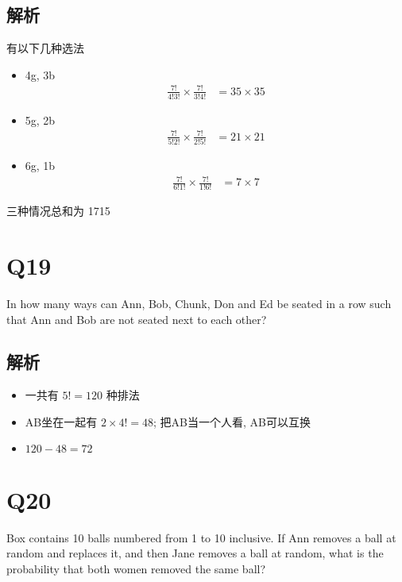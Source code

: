   \subsection{解析}

    有以下几种选法

    \begin{itemize}
      \item 4g, 3b
      \begin{align*}
        \frac{7!}{4!3!} \times \frac{7!}{3!4!} &= 35 \times 35
      \end{align*}

      \item 5g, 2b
      \begin{align*}
        \frac{7!}{5!2!} \times \frac{7!}{2!5!} &= 21 \times 21
      \end{align*}

      \item 6g, 1b
      \begin{align*}
        \frac{7!}{6!1!} \times \frac{7!}{1!6!} &= 7 \times 7
      \end{align*}
    \end{itemize}

    三种情况总和为 1715

\section{Q19}

  In how many ways can Ann, Bob, Chunk, Don and Ed be seated in a row such
  that Ann and Bob are not seated next to each other?

  \subsection{解析}

    \begin{itemize}
      \item 一共有 $ 5! = 120 $ 种排法
      \item AB坐在一起有 $ 2 \times 4! = 48 $; 把AB当一个人看, AB可以互换
      \item $ 120 - 48 = 72 $
    \end{itemize}

\section{Q20}

  Box contains 10 balls numbered from 1 to 10 inclusive. If Ann removes a
  ball at random and replaces it, and then Jane removes a ball at random,
  what is the probability that both women removed the same ball?

